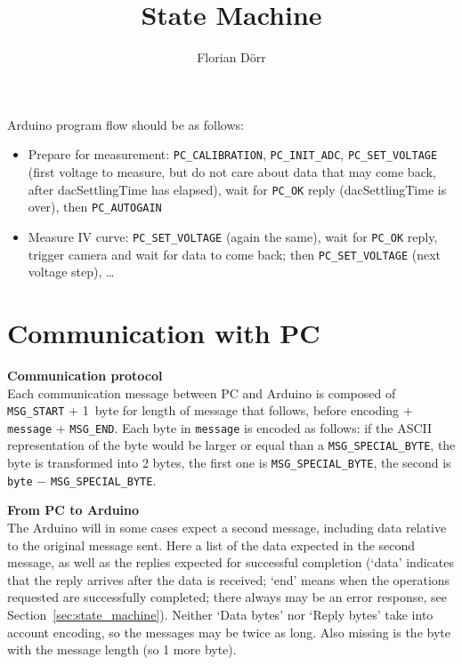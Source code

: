 \documentclass[11pt,a4paper,english]{article}
\author{Florian Dörr}
\title{State Machine}
\begin{document}
\titlepage

Arduino program flow should be as follows:
\begin{itemize}
\item Prepare for measurement: \texttt{PC\_CALIBRATION}, \texttt{PC\_INIT\_ADC}, \texttt{PC\_SET\_VOLTAGE} (first voltage to measure, but do not care about data that may come back, after dacSettlingTime has elapsed), wait for \texttt{PC\_OK} reply (dacSettlingTime is over), then \texttt{PC\_AUTOGAIN}
\item Measure IV curve: \texttt{PC\_SET\_VOLTAGE} (again the same), wait for \texttt{PC\_OK} reply, trigger camera and wait for data to come back; then \texttt{PC\_SET\_VOLTAGE} (next voltage step), \ldots
\end{itemize}

\section{Communication with PC}
\textbf{Communication protocol}\\Each communication message between PC and Arduino is composed of \texttt{MSG\_START} + 1~byte for length of message that follows, before encoding + \texttt{message} + \texttt{MSG\_END}. Each byte in \texttt{message} is encoded as follows: if the ASCII representation of the byte would be larger or equal than a \texttt{MSG\_SPECIAL\_BYTE}, the byte is transformed into 2 bytes, the first one is \texttt{MSG\_SPECIAL\_BYTE}, the second is \texttt{byte} $-$ \texttt{MSG\_SPECIAL\_BYTE}.

\vspace*{\baselineskip}
\noindent\textbf{From PC to Arduino}\\The Arduino will in some cases expect a second message, including data relative to the original message sent. Here a list of the data expected in the second message, as well as the replies expected for successful completion (`data' indicates that the reply arrives after the data is received; `end' means when the operations requested are successfully completed; there always may be an error response, see Section~\ref{sec:state_machine}). Neither `Data bytes' nor `Reply bytes' take into account encoding, so the messages may be twice as long. Also missing is the byte with the message length (so 1 more byte).
\end{document}
